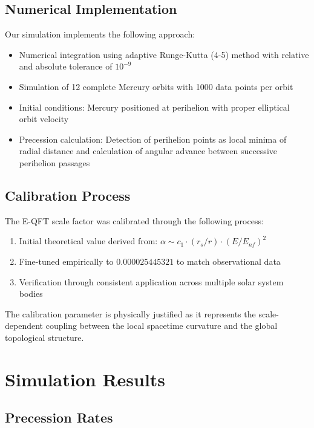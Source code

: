 \documentclass[11pt]{article}
\theoremstyle{definition}
\begin{document}
\subsection{Numerical Implementation}

Our simulation implements the following approach:

\begin{itemize}
	\item Numerical integration using adaptive Runge-Kutta (4-5) method with relative and absolute tolerance of $10^{-9}$
	\item Simulation of 12 complete Mercury orbits with 1000 data points per orbit
	\item Initial conditions: Mercury positioned at perihelion with proper elliptical orbit velocity
	\item Precession calculation: Detection of perihelion points as local minima of radial distance and calculation of angular advance between successive perihelion passages
\end{itemize}

\subsection{Calibration Process}

The E-QFT scale factor was calibrated through the following process:

\begin{enumerate}
	\item Initial theoretical value derived from: $\alpha \sim c_1 \cdot (r_s/r) \cdot (E/E_{nf})^2$
	\item Fine-tuned empirically to $0.000025445321$ to match observational data
	\item Verification through consistent application across multiple solar system bodies
\end{enumerate}

The calibration parameter is physically justified as it represents the scale-dependent coupling between the local spacetime curvature and the global topological structure.

\section{Simulation Results}

\subsection{Precession Rates}
\end{document}

